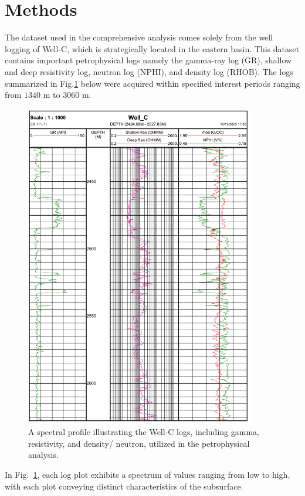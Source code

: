 \documentclass{gji}
\begin{document}
\section{Methods}\label{sec:methods}

The dataset used in the comprehensive analysis comes solely from the well logging of Well-C, which is strategically located in the eastern basin.
 This dataset contains important petrophysical logs namely the gamma-ray log (GR), shallow and deep resistivity log, neutron log (NPHI), and density log (RHOB).
 The logs summarized in Fig.\ref{fig:petroanaly1}  below were acquired within specified interest periods ranging from $1340$ m to $3060$ m.
%
\begin{figure}%
    \centering    
    \includegraphics[width=0.9\textwidth]{Plogs} %
    \caption{A spectral profile illustrating the Well-C logs, including gamma, resistivity, and density/ neutron, utilized in the petrophysical analysis.}    \label{fig:petroanaly1}
\end{figure}
%
In Fig.~\ref{fig:petroanaly1}, each log plot exhibits a spectrum of values ranging from low to high, with each plot conveying distinct characteristics of the subsurface. 
\end{document}
